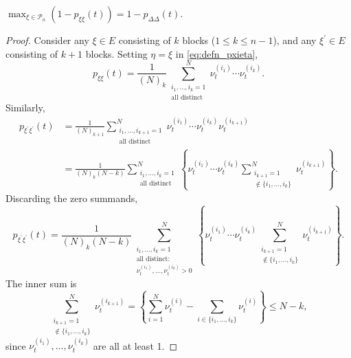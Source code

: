 \begin{lemma}\label{thm:maximum_pr}
$\max_{\xi\in \mathcal{P}_n} (1 - p_{\xi\xi}(t)) = 1 - p_{\Delta\Delta}(t)$.
\end{lemma}

\begin{proof}
Consider any $\xi \in E$ consisting of $k$ blocks ($1\leq k\leq n-1$), and any $\xi^\prime\in E$ consisting of $k+1$ blocks. 
Setting $\eta=\xi$ in \eqref{eq:defn_pxieta},
\begin{equation*}
p_{\xi\xi}(t) 
= \frac{1}{(N)_k} \sum_{\substack{i_1,\dots,i_k=1 \\ \text{all distinct}}}^N 
        \nu_t^{(i_1)} \cdots \nu_t^{(i_k)} .
\end{equation*}
Similarly,
\begin{align*}
p_{\xi^\prime\xi^\prime}(t) &= \frac{1}{(N)_{k+1}} 
        \sum_{\substack{i_1,\dots, i_{k+1} =1 \\ \text{all distinct}}}^N 
        \nu_t^{(i_1)} \cdots \nu_t^{(i_k)} \nu_t^{(i_{k+1})} \\
&= \frac{1}{(N)_k(N-k)} \sum_{\substack{i_1,\dots,i_k =1 \\ \text{all distinct}}}^N 
        \left\{ \nu_t^{(i_1)} \cdots \nu_t^{(i_k)} 
        \sum_{\substack{i_{k+1}=1 \\ \notin \{i_1,\ldots, i_k\} }}^N 
        \nu_t^{(i_{k+1})} \right\} .
\end{align*}
Discarding the zero summands,
\begin{equation*}
p_{\xi^\prime\xi^\prime}(t) 
    = \frac{1}{(N)_k(N-k)} \sum_{\substack{i_1,\dots,i_k =1 \\ \text{all distinct:} 
        \\ \nu_t^{(i_1)},\dots,\nu_t^{(i_k)} > 0 }}^N
        \left\{ \nu_t^{(i_1)} \cdots \nu_t^{(i_k)} 
        \sum_{\substack{i_{k+1}=1 \\ \notin \{i_1,\ldots, i_k\} }}^N 
        \nu_t^{(i_{k+1})} \right\} .
\end{equation*}
The inner sum is
\begin{equation*}
\sum_{\substack{i_{k+1}=1 \\ \notin \{i_1,\ldots, i_k\} }}^N \nu_t^{(i_{k+1})} 
    = \left\{ \sum_{i=1}^N \nu_t^{(i)} -  \sum_{i\in\{i_1,\dots,i_k\} } 
        \nu_t^{(i)} \right\}
    \leq N - k ,
\end{equation*}
since $\nu_t^{(i_1)},\dots,\nu_t^{(i_k)} $ are all at least 1.

\end{proof}
